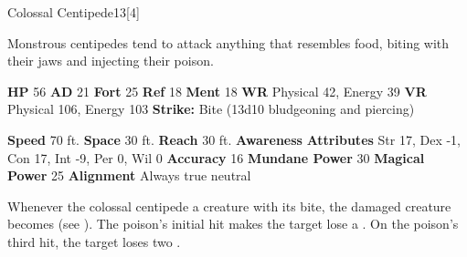   
  \begin{monsection}{Colossal Centipede}{13}[4]
    \vspace{-1em}\vspace{-1em}
    \vspace{0em}

    
    Monstrous centipedes tend to attack anything that resembles food, biting with their jaws and injecting their poison.
  
    

    \begin{spellcontent}
      \begin{spelltargetinginfo}
        \pari \textbf{HP} 56 \monsep
          \textbf{AD} 21 \monsep
          \textbf{Fort} 25 \monsep
          \textbf{Ref} 18 \monsep
          \textbf{Ment} 18
        \pari \textbf{WR} Physical 42, Energy 39 \monsep
        \textbf{VR} Physical 106, Energy 103
        \pari \textbf{Strike:}
            Bite  (13d10 bludgeoning and piercing)
      \end{spelltargetinginfo}
    \end{spellcontent}
    \begin{monsterfooter}
      \pari \textbf{Speed} 70 ft. \monsep
        \textbf{Space} 30 ft. \monsep
        \textbf{Reach} 30 ft.
      \pari \textbf{Awareness} 
      \pari \textbf{Attributes}
        Str 17, Dex -1,
        Con 17, Int -9,
        Per 0, Wil 0
      \pari \textbf{Accuracy} 16 \monsep
        \textbf{Mundane Power} 30 \monsep
      \textbf{Magical Power} 25
      \pari \textbf{Alignment} Always true neutral
    \end{monsterfooter}
  \end{monsection}
        Whenever the colossal centipede  a creature with its bite,
          the damaged creature becomes  (see ).
        The poison's initial hit makes the target lose a .
        On the poison's third hit, the target loses two .
  
